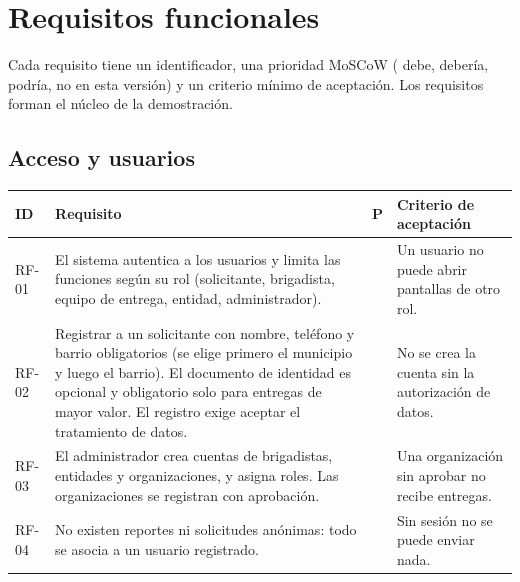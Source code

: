 \section{Requisitos funcionales}

Cada requisito tiene un identificador, una prioridad MoSCoW (\Must{} debe, \Should{} debería, \Could{} podría, \Wont{} no en esta versión) y un criterio mínimo de aceptación. Los requisitos \Must{} forman el núcleo de la demostración.

\newcommand{\rftabla}{%
  \begin{longtable}{@{}p{1.25cm}p{7.1cm}c p{4.9cm}@{}}
  \toprule
  \textbf{ID} & \textbf{Requisito} & \textbf{P} & \textbf{Criterio de aceptación} \\
  \midrule
  \endhead
}
\newcommand{\rffin}{\bottomrule\end{longtable}\addtocounter{table}{-1}}

\subsection{Acceso y usuarios}
\rftabla
RF-01 & El sistema autentica a los usuarios y limita las funciones según su rol (solicitante, brigadista, equipo de entrega, entidad, administrador). & \Must & Un usuario no puede abrir pantallas de otro rol. \\
RF-02 & Registrar a un solicitante con nombre, teléfono y barrio obligatorios (se elige primero el municipio y luego el barrio). El documento de identidad es opcional y obligatorio solo para entregas de mayor valor. El registro exige aceptar el tratamiento de datos. & \Must & No se crea la cuenta sin la autorización de datos. \\
RF-03 & El administrador crea cuentas de brigadistas, entidades y organizaciones, y asigna roles. Las organizaciones se registran con aprobación. & \Must & Una organización sin aprobar no recibe entregas. \\
RF-04 & No existen reportes ni solicitudes anónimas: todo se asocia a un usuario registrado. & \Must & Sin sesión no se puede enviar nada. \\
\rffin

